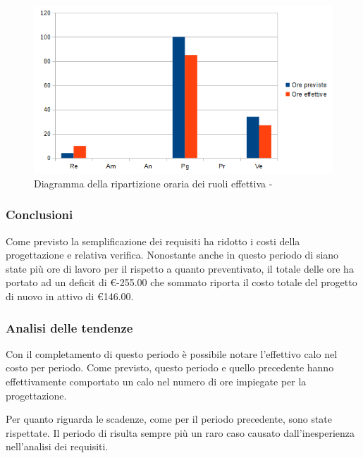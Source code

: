 \documentclass[12pt,a4paper]{article}
\begin{document}
\begin{center}
	\begin{figure}[H]
		\centering
		\includegraphics[width=\textwidth]{../img/diagrammaBarreProgettazioneDiDettaglioConsuntivo.png}
		\caption{Diagramma della ripartizione oraria dei ruoli effettiva - \FPD{}}
	\end{figure}
\end{center}

\subsubsection{Conclusioni}
Come previsto la semplificazione dei requisiti ha ridotto i costi della progettazione e relativa verifica. Nonostante anche in questo periodo di siano state più ore di lavoro per il \RE{} rispetto a quanto preventivato, il totale delle ore ha portato ad un deficit di \euro{}-255.00 che sommato riporta il costo totale del progetto di nuovo in attivo di \euro{}146.00.

\subsubsection{Analisi delle tendenze}

\par Con il completamento di questo periodo è possibile notare l'effettivo calo nel costo per periodo. Come previsto, questo periodo e quello precedente hanno effettivamente comportato un calo nel numero di ore impiegate per la progettazione. \\

\par Per quanto riguarda le scadenze, come per il periodo precedente, sono state rispettate. Il periodo di \FA{} risulta sempre più un raro caso causato dall'inesperienza nell'analisi dei requisiti. \\
\end{document}
